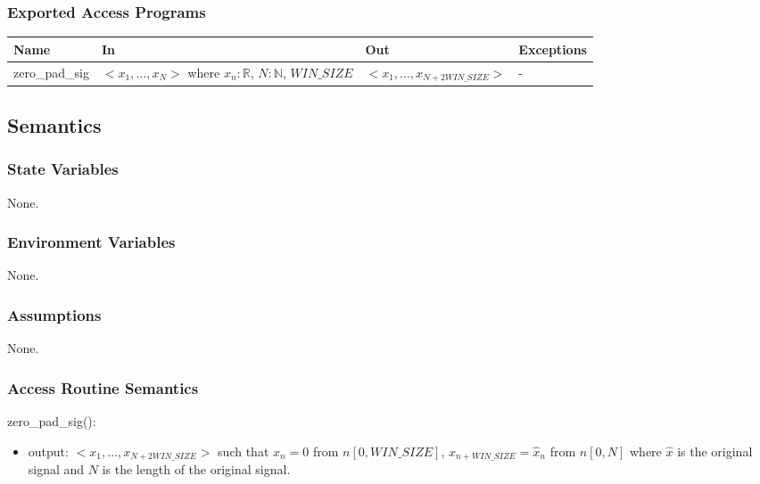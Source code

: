 \documentclass[12pt, titlepage]{article}
\begin{document}
\subsubsection{Exported Access Programs}

\begin{center}
\begin{tabular}{p{2cm} p{4cm} p{5cm} p{1cm}}
\hline
\textbf{Name} & \textbf{In} & \textbf{Out} & \textbf{Exceptions} \\
\hline
zero\_pad\_sig & $<x_1,\dots,x_N>$ where $ x_n:\mathbb{R}$, $N:\mathbb{N}$, $WIN\_SIZE$ & $<x_1,\dots,x_{N+2 WIN\_SIZE}>$ & - \\
\hline
\end{tabular}
\end{center}

\subsection{Semantics}

\subsubsection{State Variables}
None.

\subsubsection{Environment Variables}
None.

\subsubsection{Assumptions}
None.

\subsubsection{Access Routine Semantics}

\noindent zero\_pad\_sig():
\begin{itemize}
\item output: $<x_1,\dots,x_{N+2 WIN\_SIZE}>$ such that $x_n = 0$ from $n[0, WIN\_SIZE]$, $x_{n + WIN\_SIZE} = \hat{x}_n$ from $n[0, N]$ where $\hat{x}$ is the original signal and $N$ is the length of the original signal.
\end{itemize}
\end{document}
